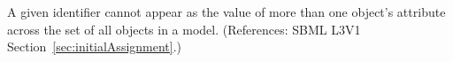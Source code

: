 A given identifier cannot appear as the value of more than one
\InitialAssignment{} object's  attribute across the set of
all \InitialAssignment{} objects in a model.  (References: SBML L3V1
Section~\ref{sec:initialAssignment}.)
